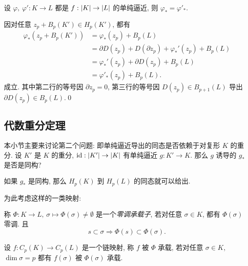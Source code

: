 \begin{Corollary}
	设 $ \varphi,\ \varphi' : K\to L $ 都是 $ f : \left| K \right| \to\left| L \right|  $ 的单纯逼近, 则 $ \varphi_*=\varphi'_* $.
\end{Corollary}
\begin{Proof}
	因对任意 $ z_p+B_p(K')\in H_p(K') $, 都有
	\[
		\begin{aligned}
			\varphi_*(z_p+B_p(K'))&=\varphi_*(z_p)+B_p(L)\\
			&=\partial D(z_p)+D(\partial z_p)+\varphi_*'(z_p)+B_p(L)\\
			&=\varphi_*'(z_p)+\partial D(z_p)+B_p(L)\\
			&=\varphi'_*(z_p)+B_p(L).
		\end{aligned}
	\]
	成立. 其中第二行的等号因 $ \partial z_p=0 $, 第三行的等号因 $ D(z_p)\in B_{p+1}(L) $ 导出 $ \partial D(z_p)\in B_p(L) $.\qed
\end{Proof}

\subsection{代数重分定理}

本小节主要来讨论第二个问题: 即单纯逼近导出的同态是否依赖于对复形 $ K $ 的重分. 设 $ K' $ 是 $ K $ 的重分, $ \mathrm{id} : \left| K' \right| \to \left| K \right|  $ 有单纯逼近 $ g : K'\to K $. 那么 $ g $ 诱导的 $ g_* $ 是否是同构?
\begin{center}
\end{center}
如果 $ g_* $ 是同构, 那么 $ H_p(K) $ 到 $ H_p(L) $ 的同态就可以给出.

为此考虑这样的一类映射:

\begin{Definition}[零调承载子]
	称 $ \varPhi : K\to L,\ \sigma\mapsto \varPhi(\sigma)\ne\emptyset $ 是一个\emph{零调承载子}, 若对任意 $ \sigma\in K $, 都有 $ \varPhi(\sigma) $ 零调. 且
	\[
		s\subset\sigma\Longrightarrow\varPhi(s)\subset\varPhi(\sigma).
	\]

	设 $ f : C_p(K)\to C_p(L) $ 是一个链映射, 称 $ f $ 被 $ \varPhi $ 承载, 若对任意 $ \sigma\in K $, $ \dim\sigma=p $ 都有 $ f(\sigma) $ 被 $ \varPhi(\sigma) $ 承载.
\end{Definition}

